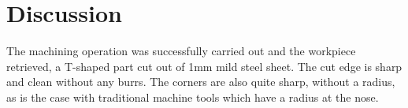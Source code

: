 \section{Discussion}
The machining operation was successfully carried out and the workpiece retrieved, a T-shaped part cut out of 1mm mild steel sheet. The cut edge is sharp and clean without any burrs. The corners are also quite sharp, without a radius, as is the case with traditional machine tools which have a radius at the nose.
